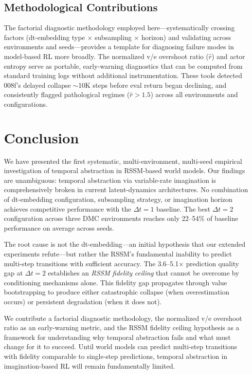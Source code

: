 \documentclass[10pt,letterpaper]{article}
\newcommand{\dt}{\Delta t}
\begin{document}
\subsection{Methodological Contributions}

The factorial diagnostic methodology employed here---systematically crossing factors (dt-embedding type $\times$ subsampling $\times$ horizon) and validating across environments and seeds---provides a template for diagnosing failure modes in model-based RL more broadly.
The normalized v/e overshoot ratio ($\hat{r}$) and actor entropy serve as portable, early-warning diagnostics that can be computed from standard training logs without additional instrumentation.
These tools detected 008f's delayed collapse $\sim$10K steps before eval return began declining, and consistently flagged pathological regimes ($\hat{r} > 1.5$) across all environments and configurations.

\section{Conclusion}\label{sec:conclusion}

We have presented the first systematic, multi-environment, multi-seed empirical investigation of temporal abstraction in RSSM-based world models.
Our findings are unambiguous: temporal abstraction via variable-rate imagination is comprehensively broken in current latent-dynamics architectures.
No combination of dt-embedding configuration, subsampling strategy, or imagination horizon achieves competitive performance with the $\dt=1$ baseline.
The best $\dt=2$ configuration across three DMC environments reaches only 22--54\% of baseline performance on average across seeds.

The root cause is not the dt-embedding---an initial hypothesis that our extended experiments refute---but rather the RSSM's fundamental inability to predict multi-step transitions with sufficient accuracy.
The 3.6--5.1$\times$ prediction quality gap at $\dt=2$ establishes an \emph{RSSM fidelity ceiling} that cannot be overcome by conditioning mechanisms alone.
This fidelity gap propagates through value bootstrapping to produce either catastrophic collapse (when overestimation occurs) or persistent degradation (when it does not).

We contribute a factorial diagnostic methodology, the normalized v/e overshoot ratio as an early-warning metric, and the RSSM fidelity ceiling hypothesis as a framework for understanding why temporal abstraction fails and what must change for it to succeed.
Until world models can predict multi-step transitions with fidelity comparable to single-step predictions, temporal abstraction in imagination-based RL will remain fundamentally limited.
\end{document}

